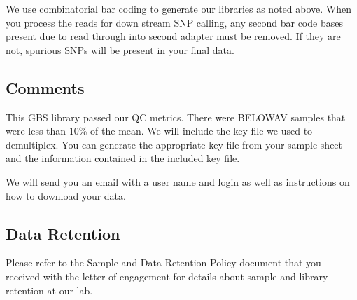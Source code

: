 \documentclass[hidelinks,12pt]{article}
\begin{document}
We use combinatorial bar coding to generate our libraries as noted above. 
When you process the reads for down stream SNP calling, any second bar code bases present due to read through into second adapter must be removed. 
If they are not, spurious SNPs will be present in your final data.

\subsection*{Comments}

This GBS library passed our QC metrics. 
There were BELOWAV samples that were less than 10\% of the mean. 
We will include the key file we used to demultiplex. 
You can generate the appropriate key file from your sample sheet and the information contained in the included key file.


We will send you an email with a user name and login as well as instructions on how to download your data.

\subsection*{Data Retention}

Please refer to the Sample and Data Retention Policy document that you received with the letter of engagement for details about sample and library retention at our lab.
\end{document}

